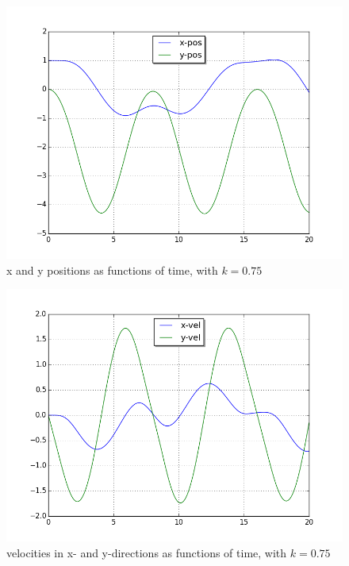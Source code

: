 \documentclass[a4paper,11pt]{article}
\theoremstyle{mytheor}
\begin{document}
\begin{figure}[!h]
\centering
\includegraphics[scale=0.5]{task1_k075_1.png}
\caption{x and y positions as functions of time, with $k = 0.75$}
\label{1k075}
\end{figure}

\begin{figure}[!h]
\centering
\includegraphics[scale=0.5]{task1_k075_2.png}
\caption{velocities in x- and y-directions as functions of time, with $k = 0.75$}
\label{2k075}
\end{figure}
\end{document}

